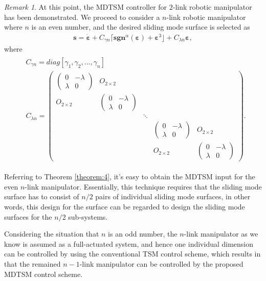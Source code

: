\documentclass[3p]{elsarticle}
\theoremstyle{plain}
\theoremstyle{remark}
\newtheorem{myrem}{Remark}
\begin{document}
\begin{myrem}
At this point, the MDTSM controller for $2$-link robotic manipulator has been demonstrated. We proceed to consider a $n$-link robotic manipulator where $n$ is an even number, and the desired sliding mode  surface is selected as
\begin{align}
\bm s = \dot{\bm \varepsilon}+C_{\gamma n}\lceil\bm{sgn}^\alpha(\bm \varepsilon)+\bm\varepsilon^3\rfloor+C_{\lambda n}{\bm\varepsilon},
\end{align}
where
\begin{align}
\begin{split}
&C_{\gamma n}=diag[\gamma_1,\gamma_2,\ldots,\gamma_n]\\
&C_{\lambda n}=
\begin{pmatrix}
\begin{pmatrix}
0 &-\lambda\\ \lambda &0
\end{pmatrix} &O_{2\times 2} & & &\\
O_{2\times 2} &\begin{pmatrix}
0 &-\lambda\\ \lambda &0
\end{pmatrix} & & &\\
& &\ddots & &\\
& & &\begin{pmatrix}
0 &-\lambda\\ \lambda &0
\end{pmatrix} &O_{2\times 2}\\
& & &O_{2\times 2} &\begin{pmatrix}
0 &-\lambda\\ \lambda &0
\end{pmatrix}
\end{pmatrix}.
\end{split}
\end{align}\par
Referring to Theorem \ref{theorem:4}, it's easy to obtain the MDTSM input for the even $n$-link manipulator. Essentially, this technique requires that the sliding mode surface has to consist of $n/2$ pairs of individual sliding mode  surfaces, in other words, this design for the surface can be regarded to design the sliding mode  surfaces for the $n/2$ sub-systems.\par
Considering the situation that $n$ is an odd number, the $n$-link manipulator as we know is assumed as a full-actuated system, and hence one individual dimension can be controlled by using the conventional TSM control scheme, which results in that the remained $n-1$-link manipulator can be controlled by the proposed MDTSM control scheme.
\end{myrem}
\end{document}
